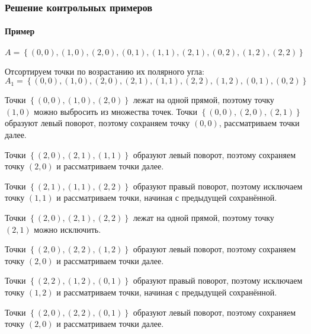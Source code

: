 \documentclass[a4paper,12pt,notitlepage,headsepline,pdftex]{scrartcl}
\begin{document}
    \subsubsection{Решение контрольных примеров}
      \paragraph{Пример }
        \begin{equation*}
          A = \left\{ (0, 0), (1, 0), (2, 0),
                      (0, 1), (1, 1), (2, 1),
                      (0, 2), (1, 2), (2, 2) \right\}
        \end{equation*}

        Отсортируем точки по возрастанию их полярного угла:
        \begin{equation*}
          A_1 = \left\{ (0, 0), (1, 0), (2, 0),
                        (2, 1), (1, 1), (2, 2),
                        (1, 2), (0, 1), (0, 2)\right\}
        \end{equation*}

        Точки $\left\{ (0, 0), (1, 0), (2, 0) \right\}$ лежат на одной прямой,
        поэтому точку $(1, 0)$ можно выбросить из множества точек.
        Точки $\left\{ (0, 0), (2, 0), (2, 1) \right\}$ образуют левый
        поворот, поэтому сохраняем точку $(0, 0)$, рассматриваем точки далее.

        Точки $\left\{ (2, 0), (2, 1), (1, 1)\right\}$ образуют левый поворот,
        поэтому сохраняем точку $(2, 0)$ и рассматриваем точки далее.

        Точки $\left\{ (2, 1), (1, 1), (2, 2) \right\}$ образуют правый
        поворот, поэтому исключаем точку $(1, 1)$ и рассматриваем точки,
        начиная с предыдущей сохранённой.

        Точки $\left\{ (2, 0), (2, 1), (2, 2) \right\}$ лежат на одной прямой,
        поэтому точку $(2, 1)$ можно исключить.

        Точки $\left\{ (2, 0), (2, 2), (1, 2) \right\}$ образуют левый
        поворот, поэтому сохраняем точку $(2, 0)$ и рассматриваем точки далее.

        Точки $\left\{ (2, 2), (1, 2), (0, 1) \right\}$ образуют правый
        поворот, поэтому исключаем точку $(1, 2)$ и рассматриваем точки,
        начиная с предыдущей сохранённой.

        Точки $\left\{ (2, 0), (2, 2), (0, 1) \right\}$ образуют левый
        поворот, поэтому сохраняем точку $(2, 0)$ и рассматриваем точки далее.
\end{document}
